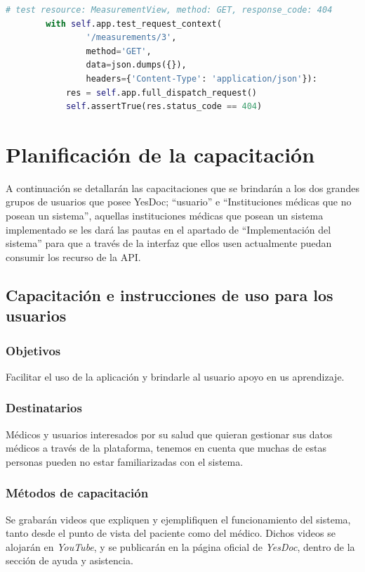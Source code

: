 \documentclass[a4paper,12pt]{article}
\begin{document}
\begin{itemize}
\begin{lstlisting}[language=Python]
        # test resource: MeasurementView, method: GET, response_code: 404
        with self.app.test_request_context(
                '/measurements/3',
                method='GET',
                data=json.dumps({}),
                headers={'Content-Type': 'application/json'}):
            res = self.app.full_dispatch_request()
            self.assertTrue(res.status_code == 404)
\end{lstlisting}


\end{itemize}











\section{Planificación de la capacitación}
A continuación se detallarán las capacitaciones que se brindarán a los dos grandes grupos de usuarios que posee YesDoc; ``usuario'' e ``Instituciones médicas que no posean un sistema'', aquellas instituciones médicas que posean un sistema implementado se les dará las pautas en el apartado de ``Implementación del sistema'' para que a través de la interfaz que ellos usen actualmente puedan consumir los recurso de la API.

\subsection{Capacitación e instrucciones de uso para los usuarios}
\subsubsection{Objetivos}
Facilitar el uso de la aplicación y brindarle al usuario apoyo en us aprendizaje.
\subsubsection{Destinatarios}
Médicos y usuarios interesados por su salud que quieran gestionar sus datos médicos a través de la plataforma, tenemos en cuenta que muchas de estas personas pueden no estar familiarizadas con el sistema.
\subsubsection{Métodos de capacitación}

Se grabarán videos que expliquen y ejemplifiquen el funcionamiento del sistema, tanto desde el punto de vista del paciente como del médico.
Dichos videos se alojarán en \textit{YouTube}, y se publicarán en la página oficial de \textit{YesDoc}, dentro de la sección de ayuda y asistencia.
\end{document}
